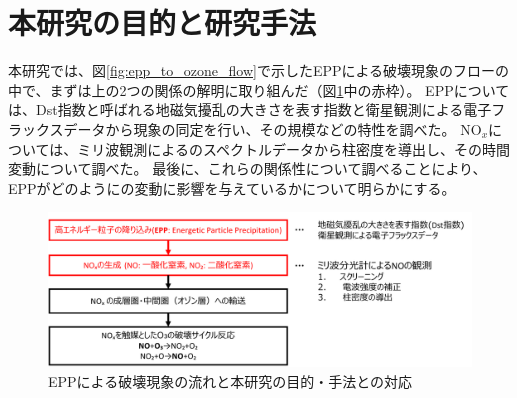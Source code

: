 \section{本研究の目的と研究手法}
\label{sec:intro_porpose}
本研究では、図\ref{fig:epp_to_ozone_flow}で示したEPPによる破壊現象のフローの中で、まずは上の2つの関係の解明に取り組んだ（図\ref{fig:flow_and_porpose}中の赤枠）。
EPPについては、Dst指数と呼ばれる地磁気擾乱の大きさを表す指数と衛星観測による電子フラックスデータから現象の同定を行い、その規模などの特性を調べた。
$\mathrm{NO}_x$については、ミリ波観測によるのスペクトルデータから柱密度を導出し、その時間変動について調べた。
最後に、これらの関係性について調べることにより、EPPがどのようにの変動に影響を与えているかについて明らかにする。
\begin{figure}[htbp]
    \centering
    \includegraphics[width=\linewidth]{master_thesis_contents/master_thesis_fig/flow_and_porpose.pdf}
    \caption{EPPによる破壊現象の流れと本研究の目的・手法との対応}
    \label{fig:flow_and_porpose}
\end{figure}
